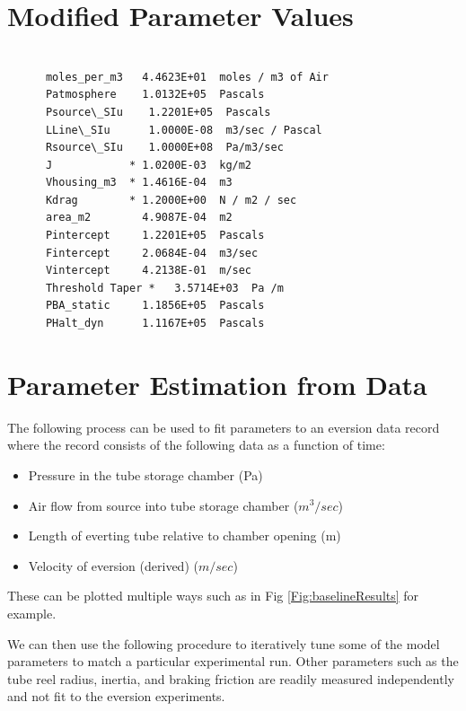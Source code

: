 \documentclass[letterpaper]{article}
\begin{document}
\section{Modified Parameter Values}\label{modParams}
\begin{verbatim}

      moles_per_m3   4.4623E+01  moles / m3 of Air
      Patmosphere    1.0132E+05  Pascals
      Psource\_SIu    1.2201E+05  Pascals
      LLine\_SIu      1.0000E-08  m3/sec / Pascal
      Rsource\_SIu    1.0000E+08  Pa/m3/sec
      J            * 1.0200E-03  kg/m2
      Vhousing_m3  * 1.4616E-04  m3
      Kdrag        * 1.2000E+00  N / m2 / sec
      area_m2        4.9087E-04  m2
      Pintercept     1.2201E+05  Pascals
      Fintercept     2.0684E-04  m3/sec
      Vintercept     4.2138E-01  m/sec
      Threshold Taper *   3.5714E+03  Pa /m
      PBA_static     1.1856E+05  Pascals
      PHalt_dyn      1.1167E+05  Pascals

\end{verbatim}

\section{Parameter Estimation from Data}

The following process can be used to fit parameters to an eversion data record where the record consists of
the following data as a function of time:

\begin{itemize}
    \item Pressure in the tube storage chamber (Pa)
    \item Air flow from source into tube storage chamber ($m^3/sec$)
    \item Length of everting tube relative to chamber opening (m)
    \item Velocity of eversion (derived) ($m/sec$)
\end{itemize}

These can be plotted multiple ways such as in Fig \ref{Fig:baselineResults} for example.

We can then use the following procedure to iteratively tune some of the  model  parameters to match a
particular experimental run.   Other parameters such as the tube reel radius, inertia, and braking
friction are readily measured independently \cite{Andy Papers}  and not fit to the eversion experiments.
\end{document}
